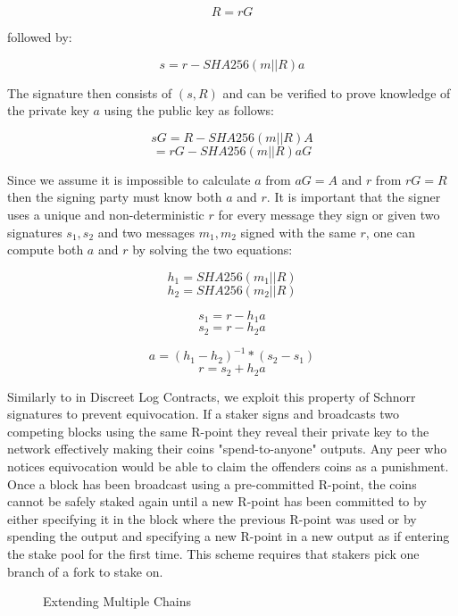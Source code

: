 \documentclass{article}
\begin{document}
$$ R = rG $$

followed by:

$$ s = r - SHA256(m || R)a $$

The signature then consists of $ (s, R) $ and can be verified to prove knowledge of the private key $ a $ using the public key as follows:

$$ sG = R - SHA256(m || R)A $$
$$ = rG - SHA256(m || R)aG$$

Since we assume it is impossible to calculate $ a $ from $ aG = A $ and $ r $ from $ rG = R $ then the signing party must know both $ a $ and $ r $. It is important that the signer uses a unique and non-deterministic $ r $ for every message they sign or given two signatures $s_1, s_2$ and two messages $m_1, m_2$ signed with the same $ r $, one can compute both $ a $ and $ r $ by solving the two equations:

$$ h_1 = SHA256(m_1 || R) $$
$$ h_2 = SHA256(m_2 || R) $$

$$ s_1 = r - h_1a $$
$$ s_2 = r - h_2a $$

$$ a = (h_1 - h_2)^{-1} * (s_2 - s_1) $$
$$ r = s_2 + h_2a$$

Similarly to in Discreet Log Contracts, we exploit this property of Schnorr signatures to prevent equivocation. If a staker signs and broadcasts two competing blocks using the same R-point they reveal their private key to the network effectively making their coins "spend-to-anyone" outputs. Any peer who notices equivocation would be able to claim the offenders coins as a punishment. Once a block has been broadcast using a pre-committed R-point, the coins cannot be safely staked again until a new R-point has been committed to by either specifying it in the block where the previous R-point was used or by spending the output and specifying a new R-point in a new output as  if entering the stake pool for the first time. This scheme requires that stakers pick one branch of a fork to stake on.

\begin{figure}[!h]
	\caption{Extending Multiple Chains}
	\label{fig1}
	\centering
{}
\end{figure}
\end{document}
